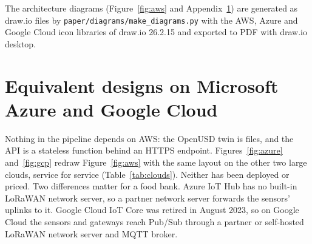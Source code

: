 \documentclass{article}
\newcommand{\code}[1]{\texttt{\small #1}}
\begin{document}
The architecture diagrams (Figure~\ref{fig:aws} and
Appendix~\ref{app:clouds}) are generated as draw.io files by
\code{paper/diagrams/make\_diagrams.py} with the AWS, Azure and Google Cloud
icon libraries of draw.io 26.2.15 and exported to PDF with draw.io desktop.


\section{Equivalent designs on Microsoft Azure and Google Cloud}
\label{app:clouds}
Nothing in the pipeline depends on AWS: the OpenUSD twin is files, and the API
is a stateless function behind an HTTPS endpoint. Figures~\ref{fig:azure}
and~\ref{fig:gcp} redraw Figure~\ref{fig:aws} with the same layout on the
other two large clouds, service for service (Table~\ref{tab:clouds}). Neither
has been deployed or priced. Two differences matter for a food bank. Azure IoT
Hub has no built-in LoRaWAN network server, so a partner network server
forwards the sensors' uplinks to it. Google Cloud IoT Core was retired in
August 2023, so on Google Cloud the sensors and gateways reach Pub/Sub through
a partner or self-hosted LoRaWAN network server and MQTT broker.
\end{document}
